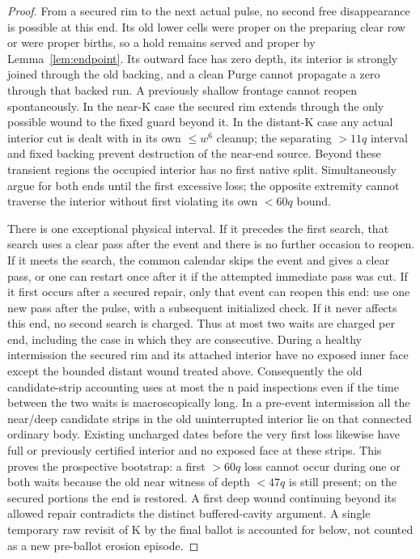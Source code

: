 \begin{proof}
From a secured rim to the next actual pulse, no second free disappearance is possible at this end. Its old lower cells were proper on the preparing clear row or were proper births, so a hold remains served and proper by Lemma~\ref{lem:endpoint}. Its outward face has zero depth, its interior is strongly joined through the old backing, and a clean Purge cannot propagate a zero through that backed run. A previously shallow frontage cannot reopen spontaneously. In the near-K case the secured rim extends through the only possible wound to the fixed guard beyond it. In the distant-K case any actual interior cut is dealt with in its own \(\le\)\(w^6\) cleanup; the separating \(>11q\) interval and fixed backing prevent destruction of the near-end source. Beyond these transient regions the occupied interior has no first native split. Simultaneously argue for both ends until the first excessive loss; the opposite extremity cannot traverse the interior without first violating its own \(<60q\) bound.

There is one exceptional physical interval. If it precedes the first search, that search uses a clear pass after the event and there is no further occasion to reopen. If it meets the search, the common calendar skips the event and gives a clear pass, or one can restart once after it if the attempted immediate pass was cut. If it first occurs after a secured repair, only that event can reopen this end: use one new pass after the pulse, with a subsequent initialized check. If it never affects this end, no second search is charged. Thus at most two waits are charged per end, including the case in which they are consecutive. During a healthy intermission the secured rim and its attached interior have no exposed inner face except the bounded distant wound treated above. Consequently the old candidate-strip accounting uses at most the n paid inspections even if the time between the two waits is macroscopically long. In a pre-event intermission all the near/deep candidate strips in the old uninterrupted interior lie on that connected ordinary body. Existing uncharged dates before the very first loss likewise have full or previously certified interior and no exposed face at these strips. This proves the prospective bootstrap: a first \(>60q\) loss cannot occur during one or both waits because the old near witness of depth \(<47q\) is still present; on the secured portions the end is restored. A first deep wound continuing beyond its allowed repair contradicts the distinct buffered-cavity argument. A single temporary raw revisit of K by the final ballot is accounted for below, not counted as a new pre-ballot erosion episode.


\end{proof}
